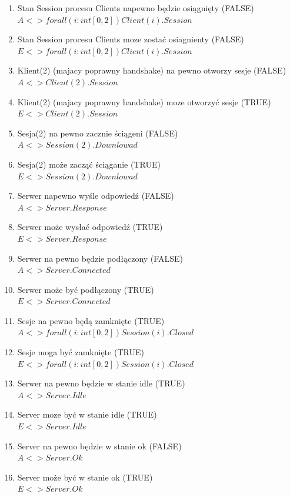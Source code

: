 \documentclass{article}
\begin{document}
\begin{enumerate}
\begin{enumerate}
					\item Stan Session procesu Clients napewno będzie osiągnięty (FALSE) \\ $ A<> forall (i:int[0,2]) Client(i).Session $
					\item Stan Session procesu Clients moze zostać osiagnienty (FALSE) \\ $ E<> forall (i:int[0,2]) Client(i).Session $
					\item Klient(2) (majacy poprawny handshake) na pewno otworzy sesje (FALSE) \\ $ A<> Client(2).Session $					
					\item Klient(2) (majacy poprawny handshake) moze otworzyć sesje (TRUE) \\ $ E<> Client(2).Session $
					\item Sesja(2) na pewno zacznie ściągeni (FALSE) \\ $ A<> Session(2).Downlowad $
					\item Sesja(2) może zacząć ściąganie (TRUE) \\ $ E<> Session(2).Downlowad $
					\item Serwer napewno wyśle odpowiedź (FALSE) \\ $ A<>Server.Response $
					\item Serwer może wysłać odpowiedź (TRUE) \\ $ E<>Server.Response $
					\item Serwer na pewno będzie podłączony (FALSE) \\ $ A<> Server.Connected $
					\item Serwer może być podłączony (TRUE) \\ $ E<> Server.Connected $
					\item Sesje na pewno będą zamknięte (TRUE) \\ $ A<> forall (i:int[0,2]) Session(i).Closed $
					\item Sesje moga być zamknięte (TRUE) \\ $ E<> forall (i:int[0,2]) Session(i).Closed $
					\item Serwer na pewno będzie w stanie idle (TRUE) \\ $ A<> Server.Idle $
					\item Server moze być w stanie idle (TRUE) \\ $ E<> Server.Idle $					
					\item Server na pewno będzie w stanie ok (FALSE) \\ $ A<> Server.Ok $
					\item Server może być w stanie ok (TRUE) \\ $ E<> Server.Ok  $					
				

\end{enumerate}
\end{enumerate}
\end{document}
